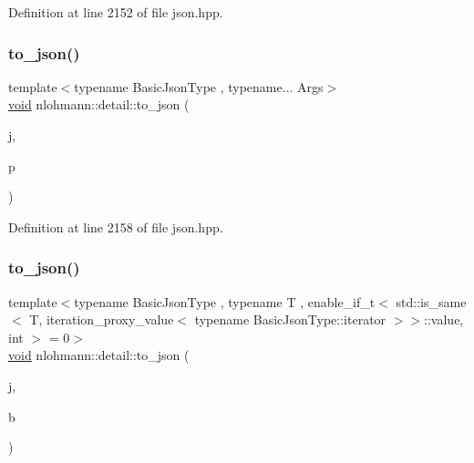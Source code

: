 Definition at line 2152 of file json.\+hpp.

\mbox{\label{namespacenlohmann_1_1detail_aa30611f74062379d3420c40487cf3bb3}} 
\subsubsection{\texorpdfstring{to\_json()}{to\_json()}\hspace{0.1cm}{\footnotesize\ttfamily [15/17]}}
{\footnotesize\ttfamily template$<$typename Basic\+Json\+Type , typename... Args$>$ \\
\mbox{\hyperlink{namespacenlohmann_1_1detail_a59fca69799f6b9e366710cb9043aa77d}{void}} nlohmann\+::detail\+::to\+\_\+json (\begin{DoxyParamCaption}\item[{Basic\+Json\+Type \&}]{j,  }\item[{const std\+::pair$<$ Args... $>$ \&}]{p }\end{DoxyParamCaption})}



Definition at line 2158 of file json.\+hpp.

\mbox{\label{namespacenlohmann_1_1detail_aaa77b0c9745130b77733a92a1a2e82ec}} 
\subsubsection{\texorpdfstring{to\_json()}{to\_json()}\hspace{0.1cm}{\footnotesize\ttfamily [16/17]}}
{\footnotesize\ttfamily template$<$typename Basic\+Json\+Type , typename T , enable\+\_\+if\+\_\+t$<$ std\+::is\+\_\+same$<$ T, iteration\+\_\+proxy\+\_\+value$<$ typename Basic\+Json\+Type\+::iterator $>$$>$\+::value, int $>$  = 0$>$ \\
\mbox{\hyperlink{namespacenlohmann_1_1detail_a59fca69799f6b9e366710cb9043aa77d}{void}} nlohmann\+::detail\+::to\+\_\+json (\begin{DoxyParamCaption}\item[{Basic\+Json\+Type \&}]{j,  }\item[{const T \&}]{b }\end{DoxyParamCaption})}



